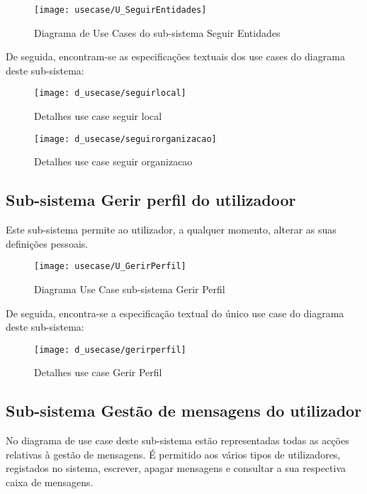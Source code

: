 \documentclass[12pt,a4paper]{article}
\begin{document}
\begin{figure}[h!]
\centering
\texttt{[image: usecase/U\_SeguirEntidades]}
\label{usecase}
\caption{Diagrama de Use Cases do sub-sistema Seguir Entidades}
\end{figure}

De seguida, encontram-se as especificações textuais dos use cases do diagrama deste sub-sistema:\\


\begin{figure}[h!]
\centering
\texttt{[image: d\_usecase/seguirlocal]}
\label{usecase}
\caption{Detalhes use case seguir local}
\end{figure}

\begin{figure}[h!]
\centering
\texttt{[image: d\_usecase/seguirorganizacao]}
\label{usecase}
\caption{Detalhes use case seguir organizacao}
\end{figure}

\newpage
\subsection{Sub-sistema Gerir perfil do utilizadoor}
Este sub-sistema permite ao utilizador, a qualquer momento, alterar as suas definições pessoais.\\

\begin{figure}[h!]
\centering
\texttt{[image: usecase/U\_GerirPerfil]}
\label{usecase}
\caption{Diagrama Use Case sub-sistema Gerir Perfil}
\end{figure}

De seguida, encontra-se a especificação textual do único use case do diagrama deste sub-sistema:\\

\begin{figure}[h!]
\centering
\texttt{[image: d\_usecase/gerirperfil]}
\label{usecase}
\caption{Detalhes use case Gerir Perfil}
\end{figure}

\newpage
\subsection{Sub-sistema Gestão de mensagens do utilizador}
No diagrama de use case deste sub-sistema estão representadas todas as acções relativas à gestão de mensagens. É permitido aos vários tipos de utilizadores, registados no sistema, escrever, apagar mensagens e consultar a sua respectiva caixa de mensagens.\\
\end{document}

